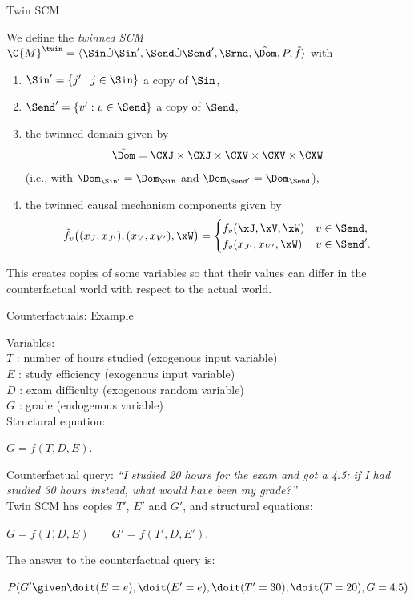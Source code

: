 \begin{frame}{Twin SCM}
\begin{definition}
  We define the \emph{twinned SCM} $\C{M}^\twin = \langle \Sin \dot\cup \Sin', \Send \dot\cup \Send', \Srnd, \tilde{\Dom}, P, \tilde{f} \rangle$
  with 
  \begin{enumerate}
    \item $\Sin' = \{j' : j \in \Sin\}$ a copy of $\Sin$,
    \item $\Send' = \{v' : v \in \Send\}$ a copy of $\Send$, 
    \item the twinned domain given by
  $$\tilde{\Dom} = \CXJ \times \CXJ \times \CXV \times \CXV \times \CXW$$
  (i.e., with $\Dom_{\Sin'} = \Dom_{\Sin}$ and $\Dom_{\Send'} = \Dom_{\Send}$),
    \item the twinned causal mechanism components given by
  $$\tilde{f}_v\big((x_J,x_{J'}),(x_V,x_{V'}),\xW\big) = 
  \begin{cases}
    f_v(\xJ,\xV,\xW) & v \in \Send,  \\
    f_v(x_{J'},x_{V'},\xW) & v \in \Send'.
  \end{cases}$$
  \end{enumerate}
\end{definition}
  This creates copies of some variables so that their values can differ in the counterfactual world with respect to the actual world.
\end{frame}

\begin{frame}{Counterfactuals: Example}
  \begin{example}
  Variables:\\
    \quad $T$ : number of hours studied (exogenous input variable)\\
    \quad $E$ : study efficiency (exogenous input variable)\\
    \quad $D$ : exam difficulty (exogenous random variable)\\
    \quad $G$ : grade (endogenous variable)\\
  Structural equation:\\
  \smallskip
  \centerline{$G = f(T,D,E).$}
  \smallskip
  Counterfactual query: {\it ``I studied 20 hours for the exam and
got a 4.5; if I had studied 30 hours instead, what would have been my grade?''}\\

    \medskip
    Twin SCM has copies $T'$, $E'$ and $G'$, and structural equations:\\
    \smallskip
    \centerline{$G = f(T,D,E) \qquad G' = f(T',D,E').$}
    \smallskip
    The answer to the counterfactual query is:\\
    \smallskip
    \centerline{$P(G' \given \doit(E=e), \doit(E'=e), \doit(T'=30), \doit(T=20), G=4.5)$}
    \smallskip
  \end{example}
\end{frame}

